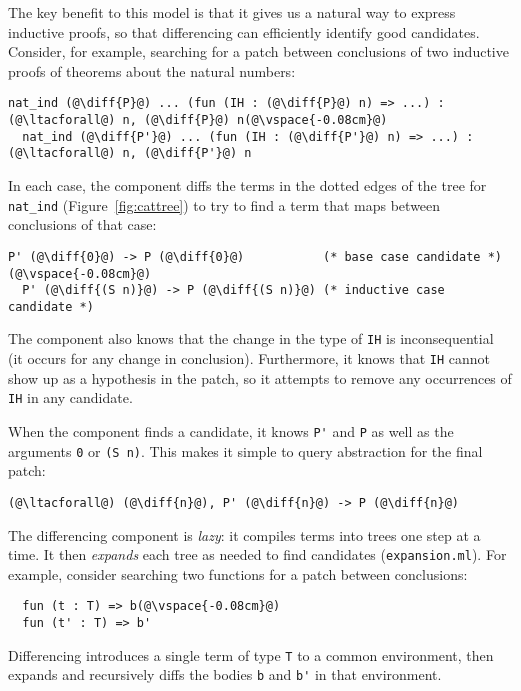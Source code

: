 The key benefit to this model is that it gives us a natural way to express inductive proofs, so
that differencing can efficiently identify good candidates.
Consider, for example, searching for a patch between conclusions of two inductive proofs of theorems about the natural numbers:

\begin{lstlisting}[language=coq]
  nat_ind (@\diff{P}@) ... (fun (IH : (@\diff{P}@) n) => ...) : (@\ltacforall@) n, (@\diff{P}@) n(@\vspace{-0.08cm}@)
  nat_ind (@\diff{P'}@) ... (fun (IH : (@\diff{P'}@) n) => ...) : (@\ltacforall@) n, (@\diff{P'}@) n
\end{lstlisting}
In each case, the component diffs the terms in the dotted edges of the tree for \lstinline{nat_ind} (Figure~\ref{fig:cattree}) to
try to find a term that maps between conclusions of that case:

\begin{lstlisting}[language=coq]
  P' (@\diff{0}@) -> P (@\diff{0}@)           (* base case candidate *)(@\vspace{-0.08cm}@)
  P' (@\diff{(S n)}@) -> P (@\diff{(S n)}@) (* inductive case candidate *)
\end{lstlisting}
The component also knows that the change in the type of \lstinline{IH} is inconsequential (it occurs for any change in conclusion).
Furthermore, it knows that \lstinline{IH} cannot show up as a hypothesis in the patch,
so it attempts to remove any occurrences of \lstinline{IH} in any candidate.

When the component finds a candidate, it knows \lstinline{P'} and \lstinline{P}
as well as the arguments \lstinline{0} or \lstinline{(S n)}. This makes it simple
to query abstraction for the final patch:

\begin{lstlisting}[language=coq]
  (@\ltacforall@) (@\diff{n}@), P' (@\diff{n}@) -> P (@\diff{n}@)
\end{lstlisting}


The differencing component is \textit{lazy}: it compiles terms into trees one step at a time.
It then \emph{expands} each tree as needed to find candidates (\lstinline{expansion.ml}).
For example, consider searching two functions for a patch between conclusions:

\begin{lstlisting}
  fun (t : T) => b(@\vspace{-0.08cm}@)
  fun (t' : T) => b'
\end{lstlisting}
Differencing introduces a single term of type \lstinline{T} to a common environment,
then expands and recursively diffs the bodies \lstinline{b} and \lstinline{b'} in that environment.

